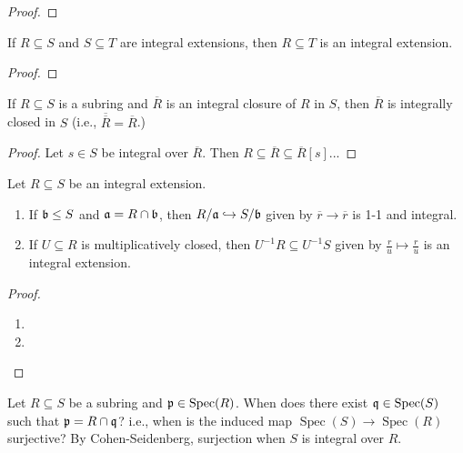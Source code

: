 \begin{proof}
\end{proof}


\begin{corollary}
    If $R \subseteq S$ and $S \subseteq T$ are integral extensions, then $R \subseteq T$ is an integral extension.
\end{corollary}

\begin{proof}
\end{proof}

\begin{corollary}
    If $R \subseteq S$ is a subring and $\overbar{R}$ is an integral closure of $R$ in $S$, then $\overbar{R}$ is integrally closed in $S$ (i.e., ${\overbar{\overbar{R}}} = \overbar{R}$.)
\end{corollary}

\begin{proof}
    Let $s \in S$ be integral over $\overbar{R}$. Then $R \subseteq \overbar{R} \subseteq \overbar{R}[s]$...
\end{proof}

\begin{proposition}
    Let $R \subseteq S$ be an integral extension.
    \begin{enumerate}
        \item If $\mathfrak{b} \leq S$ and $\mathfrak{a} = R \cap \mathfrak{b}$, then $R/\mathfrak{a} \hookrightarrow S/\mathfrak{b}$ given by $\overbar{r} \to \overbar{r}$ is 1-1 and integral. 
        \item If $U \subseteq R$ is multiplicatively closed, then $U^{-1}R \subseteq U^{-1}S$ given by $\frac{r}{u} \mapsto \frac{r}{u}$ is an integral extension.
    \end{enumerate}
\end{proposition}

\begin{proof}
    \begin{enumerate}
        \item 
        \item 
    \end{enumerate}
\end{proof}

\begin{discussion}
    Let $R \subseteq S$ be a subring and $\mathfrak{p} \in \operatorname{Spec}(R)$. When does there exist $\mathfrak{q} \in \operatorname{Spec}(S)$ such that $\mathfrak{p} = R \cap \mathfrak{q}$? i.e., when is the induced map $\operatorname{Spec}(S) \to \operatorname{Spec}(R)$ surjective? By Cohen-Seidenberg, surjection when $S$ is integral over $R$.
\end{discussion}

